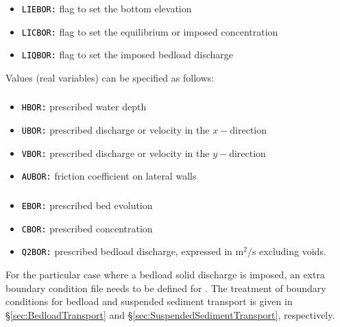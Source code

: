 {\subsubsection{\gaia{}}
\begin{itemize}
\item \texttt{\textcolor{black}{LIEBOR:}} flag to set the bottom elevation
\item \texttt{\textcolor{black}{LICBOR:}} flag to set the equilibrium or imposed concentration
  \item \texttt{\textcolor{black}{LIQBOR:}} flag to set the imposed bedload discharge
\end{itemize}

Values (real variables) can be specified as follows:
\subsubsection{}
\begin{itemize}
\item \texttt{\textcolor{black}{HBOR:}} prescribed water depth
\item \texttt{\textcolor{black}{UBOR:}} prescribed discharge or velocity in the $x-$direction
\item \texttt{\textcolor{black}{VBOR:}} prescribed discharge or velocity in the $y-$direction
\item \texttt{\textcolor{black}{AUBOR:}} friction coefficient on lateral walls
\end{itemize}
\subsubsection{\gaia{}}
\begin{itemize}
\item \texttt{\textcolor{black}{EBOR:}} prescribed bed evolution
\item \texttt{\textcolor{black}{CBOR:}} prescribed concentration
\item \texttt{\textcolor{black}{Q2BOR:}} prescribed bedload discharge, expressed in m$^2/$s excluding voids.
\end{itemize}

For the particular case where a bedload solid discharge is imposed, an extra boundary condition file needs to be defined for \gaia{}. The treatment of boundary conditions for bedload and suspended sediment transport is given in \S\ref{sec:BedloadTransport} and \S\ref{sec:SuspendedSedimentTransport}, respectively.

}
